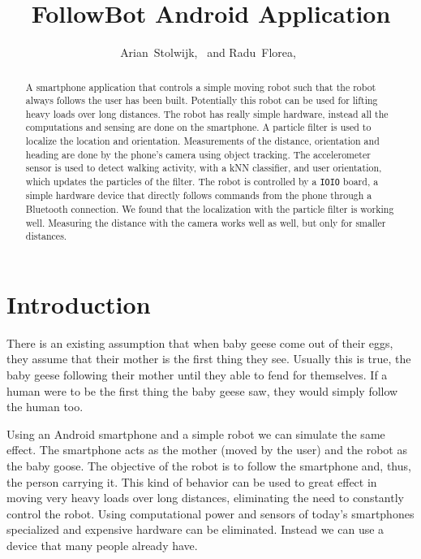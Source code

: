 \documentclass[journal]{IEEEtran}
\begin{document}
\title{FollowBot Android Application}


\author{Arian~Stolwijk,~
        and Radu~Florea,~}%

%
{}
\maketitle

\begin{abstract}

A smartphone application that controls a simple moving robot such that the
robot always follows the user has been built. Potentially this robot can be
used for lifting heavy loads over long distances. The robot has really simple
hardware, instead all the computations and sensing are done on the smartphone.
A particle filter is used to localize the location and orientation.
Measurements of the distance, orientation and heading are done by the phone's
camera using object tracking. The accelerometer sensor is used to detect
walking activity, with a kNN classifier, and user orientation, which updates
the particles of the filter. The robot is controlled by a \texttt{IOIO} board,
a simple hardware device that directly follows commands from the phone through
a Bluetooth connection. We found that the localization with the particle filter
is working well. Measuring the distance with the camera works well as well, but
only for smaller distances.

\end{abstract}

\section{Introduction}

There is an existing assumption that when baby geese come out of their eggs,
they assume that their mother is the first thing they see. Usually this is
true, the baby geese following their mother until they able to fend for
themselves. If a human were to be the first thing the baby geese saw, they
would simply follow the human too.

Using an Android smartphone and a simple robot we can simulate the same effect.
The smartphone acts as the mother (moved by the user) and the robot as the baby
goose. The objective of the robot is to follow the smartphone and, thus, the
person carrying it. This kind of behavior can be used to great effect in moving
very heavy loads over long distances, eliminating the need to constantly
control the robot. Using computational power and sensors of today's smartphones
specialized and expensive hardware can be eliminated. Instead we can use a
device that many people already have.
\end{document}
